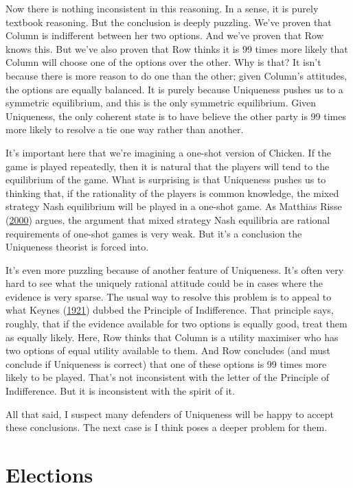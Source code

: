 \documentclass[
  12pt,
  letterpaper,
  DIV=11,
  numbers=noendperiod]{scrreprt}
\begin{document}
Now there is nothing inconsistent in this reasoning. In a sense, it is
purely textbook reasoning. But the conclusion is deeply puzzling. We've
proven that Column is indifferent between her two options. And we've
proven that Row knows this. But we've also proven that Row thinks it is
99 times more likely that Column will choose one of the options over the
other. Why is that? It isn't because there is more reason to do one than
the other; given Column's attitudes, the options are equally balanced.
It is purely because Uniqueness pushes us to a symmetric equilibrium,
and this is the only symmetric equilibrium. Given Uniqueness, the only
coherent state is to have believe the other party is 99 times more
likely to resolve a tie one way rather than another.

It's important here that we're imagining a one-shot version of Chicken.
If the game is played repeatedly, then it is natural that the players
will tend to the equilibrium of the game. What is surprising is that
Uniqueness pushes us to thinking that, if the rationality of the players
is common knowledge, the mixed strategy Nash equilibrium will be played
in a one-shot game. As Matthias Risse
(\protect\hyperlink{ref-Risse2000}{2000}) argues, the argument that
mixed strategy Nash equilibria are rational requirements of one-shot
games is very weak. But it's a conclusion the Uniqueness theorist is
forced into.

It's even more puzzling because of another feature of Uniqueness. It's
often very hard to see what the uniquely rational attitude could be in
cases where the evidence is very sparse. The usual way to resolve this
problem is to appeal to what Keynes
(\protect\hyperlink{ref-Keynes1921}{1921}) dubbed the Principle of
Indifference. That principle says, roughly, that if the evidence
available for two options is equally good, treat them as equally likely.
Here, Row thinks that Column is a utility maximiser who has two options
of equal utility available to them. And Row concludes (and must conclude
if Uniqueness is correct) that one of these options is 99 times more
likely to be played. That's not inconsistent with the letter of the
Principle of Indifference. But it is inconsistent with the spirit of it.

All that said, I suspect many defenders of Uniqueness will be happy to
accept these conclusions. The next case is I think poses a deeper
problem for them.

\hypertarget{elections}{%
\section{Elections}\label{elections}}
\end{document}
